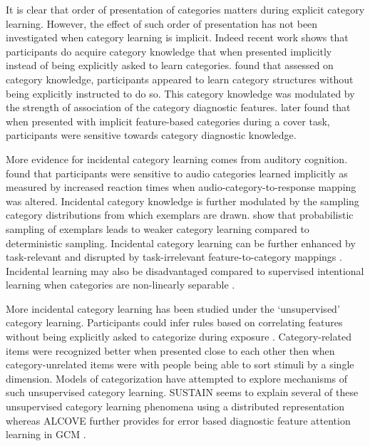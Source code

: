 It is clear that order of presentation of categories matters during explicit category learning. However, the effect of such order of presentation has not been investigated when category learning is implicit. Indeed recent work shows that participants do acquire category knowledge that when presented implicitly instead of being explicitly asked to learn categories. \cite{unger2022ready} found that assessed on category knowledge, participants appeared to learn category structures without being explicitly instructed to do so. This category knowledge was modulated by the strength of association of the category diagnostic features. \cite{unger2023without} later found that when presented with implicit feature-based categories during a cover task, participants were sensitive towards category diagnostic knowledge. 

More evidence for incidental category learning comes from auditory cognition. \cite{gabay2015incidental} found that participants were sensitive to audio categories learned implicitly as measured by increased reaction times when audio-category-to-response mapping was altered. Incidental category knowledge is further modulated by the sampling category distributions from which exemplars are drawn. \cite{roark2018task} show that probabilistic sampling of exemplars leads to weaker category learning compared to deterministic sampling. Incidental category learning can be further enhanced by task-relevant and disrupted by task-irrelevant feature-to-category mappings \cite{roark2022representational}. Incidental learning may also be disadvantaged compared to supervised intentional learning when categories are non-linearly separable \cite{love2002comparing}.

More incidental category learning has been studied under the `unsupervised' category learning. Participants could infer rules based on correlating features without being explicitly asked to categorize during exposure \cite{billman1996unsupervised}. Category-related items were recognized better when presented close to each other then when category-unrelated items were \cite{medin1994presentation} with people being able to sort stimuli by a single dimension\cite{medin1987family}. Models of categorization have attempted to explore mechanisms of such unsupervised category learning.  SUSTAIN \cite{love2004sustain} seems to explain several of these unsupervised category learning phenomena using a distributed representation whereas ALCOVE \cite{kruschke2020alcove} further provides for error based diagnostic feature attention learning in GCM \cite{nosofsky2011generalized, nosofsky1986attention}.

